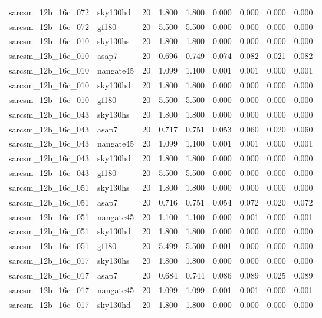 \begin{tabular}{llrrrrrrr}
sarcsm\_12b\_16c\_072 & sky130hd & 20 & 1.800 & 1.800 & 0.000 & 0.000 & 0.000 & 0.000 \\
sarcsm\_12b\_16c\_072 & gf180 & 20 & 5.500 & 5.500 & 0.000 & 0.000 & 0.000 & 0.000 \\
sarcsm\_12b\_16c\_010 & sky130hs & 20 & 1.800 & 1.800 & 0.000 & 0.000 & 0.000 & 0.000 \\
sarcsm\_12b\_16c\_010 & asap7 & 20 & 0.696 & 0.749 & 0.074 & 0.082 & 0.021 & 0.082 \\
sarcsm\_12b\_16c\_010 & nangate45 & 20 & 1.099 & 1.100 & 0.001 & 0.001 & 0.000 & 0.001 \\
sarcsm\_12b\_16c\_010 & sky130hd & 20 & 1.800 & 1.800 & 0.000 & 0.000 & 0.000 & 0.000 \\
sarcsm\_12b\_16c\_010 & gf180 & 20 & 5.500 & 5.500 & 0.000 & 0.000 & 0.000 & 0.000 \\
sarcsm\_12b\_16c\_043 & sky130hs & 20 & 1.800 & 1.800 & 0.000 & 0.000 & 0.000 & 0.000 \\
sarcsm\_12b\_16c\_043 & asap7 & 20 & 0.717 & 0.751 & 0.053 & 0.060 & 0.020 & 0.060 \\
sarcsm\_12b\_16c\_043 & nangate45 & 20 & 1.099 & 1.100 & 0.001 & 0.001 & 0.000 & 0.001 \\
sarcsm\_12b\_16c\_043 & sky130hd & 20 & 1.800 & 1.800 & 0.000 & 0.000 & 0.000 & 0.000 \\
sarcsm\_12b\_16c\_043 & gf180 & 20 & 5.500 & 5.500 & 0.000 & 0.000 & 0.000 & 0.000 \\
sarcsm\_12b\_16c\_051 & sky130hs & 20 & 1.800 & 1.800 & 0.000 & 0.000 & 0.000 & 0.000 \\
sarcsm\_12b\_16c\_051 & asap7 & 20 & 0.716 & 0.751 & 0.054 & 0.072 & 0.020 & 0.072 \\
sarcsm\_12b\_16c\_051 & nangate45 & 20 & 1.100 & 1.100 & 0.000 & 0.001 & 0.000 & 0.001 \\
sarcsm\_12b\_16c\_051 & sky130hd & 20 & 1.800 & 1.800 & 0.000 & 0.000 & 0.000 & 0.000 \\
sarcsm\_12b\_16c\_051 & gf180 & 20 & 5.499 & 5.500 & 0.001 & 0.000 & 0.000 & 0.000 \\
sarcsm\_12b\_16c\_017 & sky130hs & 20 & 1.800 & 1.800 & 0.000 & 0.000 & 0.000 & 0.000 \\
sarcsm\_12b\_16c\_017 & asap7 & 20 & 0.684 & 0.744 & 0.086 & 0.089 & 0.025 & 0.089 \\
sarcsm\_12b\_16c\_017 & nangate45 & 20 & 1.099 & 1.099 & 0.001 & 0.001 & 0.000 & 0.001 \\
sarcsm\_12b\_16c\_017 & sky130hd & 20 & 1.800 & 1.800 & 0.000 & 0.000 & 0.000 & 0.000 \\

\end{tabular}
